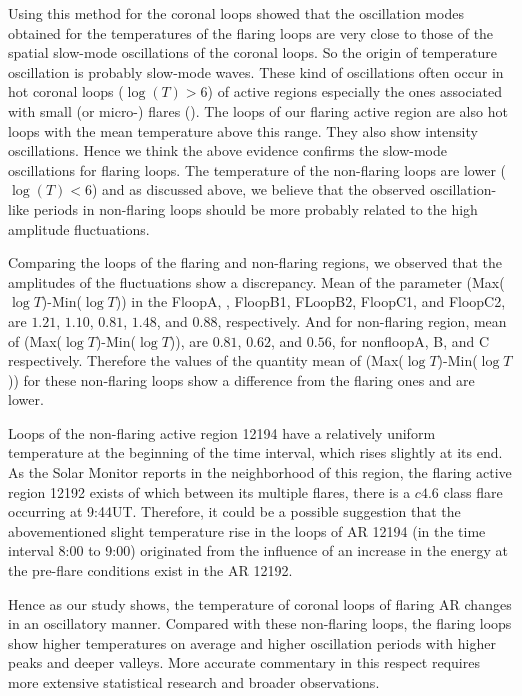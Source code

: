 \documentclass[oneside,onecolumn]{article}
\begin{document}
Using this method for the coronal loops showed that the oscillation modes obtained for the temperatures of the flaring loops are very close to those of the spatial slow-mode oscillations of the coronal loops. 
So the origin of temperature oscillation is probably slow-mode waves. These kind of oscillations often occur in hot coronal loops ($\log(T)>6$) of active regions especially the ones associated with small (or micro-) flares (\citet{ref:Wang2021}). The loops of our flaring active region are also hot loops with the mean temperature above this range. They also show intensity oscillations. Hence we think the above evidence confirms the slow-mode oscillations for flaring loops. The temperature of the non-flaring loops are lower ($\log(T)<6$) and as discussed above, we believe that the observed oscillation-like periods in non-flaring loops should be more probably related to the high amplitude fluctuations. 


Comparing the loops of the flaring and non-flaring regions, we observed that the amplitudes of the fluctuations show a discrepancy. Mean of the parameter (Max($\log{T}$)-Min($\log{T}$)) in the FloopA, , FloopB1, FLoopB2, FloopC1, and FloopC2, are $1.21$, $1.10$, $0.81$, $1.48$, and $0.88$, respectively. And for non-flaring region, mean of (Max($\log{T}$)-Min($\log{T}$)), are $0.81$, $0.62$, and $0.56$, for nonfloopA, B, and C respectively. Therefore the values of the quantity mean of (Max($\log{T}$)-Min($\log{T}$)) for these non-flaring loops show a difference from the flaring ones and are lower.

Loops of the non-flaring active region 12194 have a relatively uniform temperature at the beginning of the time interval, which rises slightly at its end. As the Solar Monitor reports in the neighborhood of this region, the flaring active region 12192 exists of which between its multiple flares, there is a $c4.6$ class flare occurring at 9:44UT. Therefore, it could be a possible suggestion that the abovementioned slight temperature rise in the loops of AR 12194 (in the time interval 8:00 to 9:00) originated from the influence of an increase in the energy at the pre-flare conditions exist in the AR 12192.  

Hence as our study shows, the temperature of coronal loops of flaring AR changes in an oscillatory manner. Compared with these non-flaring loops, the flaring loops show higher temperatures on average and higher oscillation periods with higher peaks and deeper valleys. More accurate commentary in this respect requires more extensive statistical research and broader observations.
\end{document}
